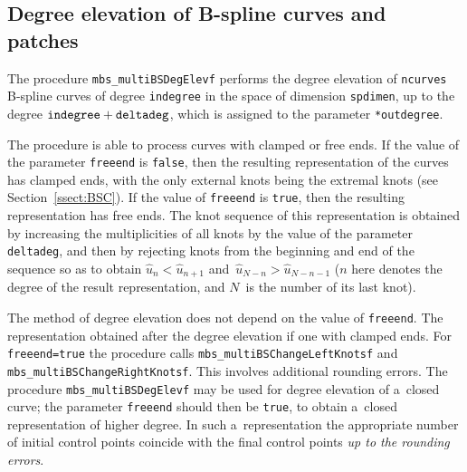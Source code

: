 \subsection{Degree elevation of B-spline curves and patches}

\begin{sloppypar}
\hspace*{\parindent}
The procedure \texttt{mbs\_multiBSDegElevf} performs the degree elevation
of \texttt{ncurves} B-spline curves of degree \texttt{indegree}
in the space of dimension \texttt{spdimen}, up to the degree
$\mathord{\mbox{\texttt{indegree}}}+\mathord{\mbox{\texttt{deltadeg}}}$,
which is assigned to the parameter \texttt{*outdegree}.
\end{sloppypar}

The procedure is able to process curves with clamped or free ends.
If the value of the parameter \texttt{freeend} is \texttt{false}, then
the resulting representation of the curves has clamped ends,
with the only external knots being the extremal knots
(see Section~\ref{ssect:BSC}). If the value of
\texttt{freeend} is \texttt{true}, then the resulting representation
has free ends. The knot sequence of this representation is obtained by
increasing the multiplicities of all knots by the value of the parameter
\texttt{deltadeg}, and then by rejecting knots from the beginning and end
of the sequence so as to obtain $\hat{u}_n<\hat{u}_{n+1}$
and~$\hat{u}_{N-n}>\hat{u}_{N-n-1}$ ($n$ here denotes the degree of
the result representation, and $N$~is the number of its last knot).

\begin{sloppypar}
The method of degree elevation does not depend on the value of
\texttt{freeend}. The representation obtained after the degree elevation
if one with clamped ends. For \texttt{freeend=true} the procedure calls
\texttt{mbs\_multiBSChangeLeftKnotsf} and
\texttt{mbs\_multiBSChangeRightKnotsf}. This involves additional rounding errors.
The procedure \texttt{mbs\_multiBSDegElevf} may be used for degree elevation of
a~closed curve; the parameter \texttt{freeend} should then be \texttt{true},
to obtain a~closed representation of higher degree. In such a~representation
the appropriate number of initial control points coincide with the final
control points \emph{up to the rounding errors}.%
\end{sloppypar}


